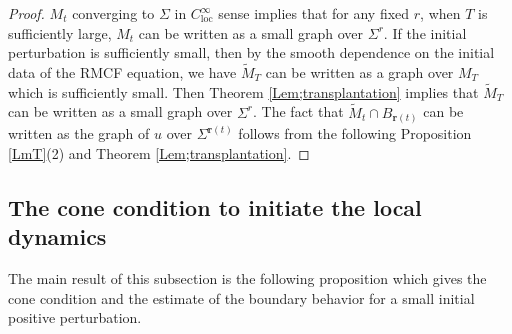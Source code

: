\documentclass[12pt]{amsart}
\numberwithin{equation}{section}
\numberwithin{equation}{section}
\DeclareMathOperator{\loc}{loc}
\begin{document}
	\begin{proof}
		$M_t$ converging to $\Sigma$ in $C_{\loc}^\infty$ sense implies that for any fixed $r$, when $T$ is sufficiently large, $M_t$ can be written as a small graph over $\Sigma^r$. If the initial perturbation is sufficiently small, then by the smooth dependence on the initial data of the RMCF equation, we have $\widetilde{M}_T$ can be written as a graph over $M_T$ which is sufficiently small. Then Theorem \ref{Lem;transplantation} implies that $\widetilde{M}_T$ can be written as a small graph over $\Sigma^r$. The fact that $\widetilde{M}_{t}\cap B_{\mathbf{r}(t)}$ can be written as the graph of $u$ over $\Sigma^{\mathbf{r}(t)}$ follows from  the following Proposition \ref{LmT}(2) and Theorem \ref{Lem;transplantation}. \end{proof}
	
	\subsection{The cone condition to initiate the local dynamics}\label{SSInitiateCone}
	The main result of this subsection is the following proposition which gives the cone condition and the estimate of the boundary behavior for a small initial positive perturbation. 
	
\end{document}
